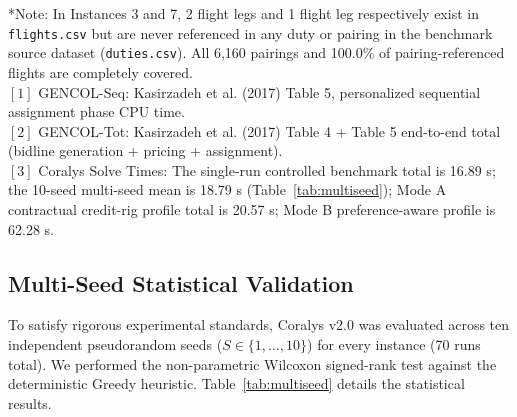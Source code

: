 \documentclass[journal]{IEEEtran}
\begin{document}
\begin{table}[t]
{\begin{tabular}{lrrrrrrrrrrrrrr}
\bottomrule
\end{tabular}%
}
\begin{flushleft}
\footnotesize
*Note: In Instances 3 and 7, 2 flight legs and 1 flight leg respectively exist in \texttt{flights.csv} but are never referenced in any duty or pairing in the benchmark source dataset (\texttt{duties.csv}). All 6,160 pairings and 100.0\% of pairing-referenced flights are completely covered.\\
$[1]$ GENCOL-Seq: Kasirzadeh et al. (2017) Table 5, personalized sequential assignment phase CPU time.\\
$[2]$ GENCOL-Tot: Kasirzadeh et al. (2017) Table 4 + Table 5 end-to-end total (bidline generation + pricing + assignment).\\
$[3]$ Coralys Solve Times: The single-run controlled benchmark total is 16.89 s; the 10-seed multi-seed mean is 18.79 s (Table~\ref{tab:multiseed}); Mode A contractual credit-rig profile total is 20.57 s; Mode B preference-aware profile is 62.28 s.
\end{flushleft}
\end{table}

\subsection{Multi-Seed Statistical Validation}

To satisfy rigorous experimental standards, Coralys v2.0 was evaluated across ten independent pseudorandom seeds ($S \in \{1, \dots, 10\}$) for every instance (70 runs total). We performed the non-parametric Wilcoxon signed-rank test against the deterministic Greedy heuristic. Table~\ref{tab:multiseed} details the statistical results.
\end{document}
